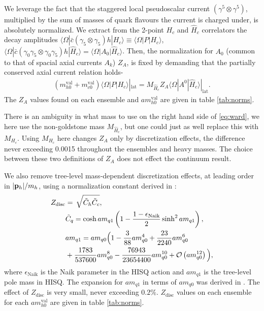 We leverage the fact that the staggered local pseudoscalar current $(\gamma^5\otimes \gamma^5)$, multiplied by the sum of masses of quark flavours the current is charged under, is absolutely normalized. We extract from the 2-point $H_c$ and $\hat{H}_c$ correlators the decay amplitudes $\langle \Omega | \bar{c} (\gamma_5\otimes \gamma_5) h | H_c \rangle \equiv \langle \Omega | P | H_c \rangle$, $\langle \Omega | \bar{c} (\gamma_0\gamma_5 \otimes \gamma_0\gamma_5) h | \hat{H}_c \rangle = \langle \Omega | A_0 | \hat{H}_c \rangle$. Then, the normalization for $A_0$ (common to that of spacial axial currents $A_k$) $Z_A$, is fixed by demanding that the partially conserved axial current relation holds-
\begin{align}
  (m^{\text{val}}_{h0} + m^{\text{val}}_{c0}) \langle \Omega | P | H_c \rangle|_{\text{lat}} = M_{\hat{H}_c} Z_A \langle \Omega | A^0 | \hat{H}_c \rangle|_{\text{lat}}.
  \label{eq:ward}
\end{align}
The $Z_A$ values found on each ensemble and $am^{\text{val}}_{h0}$ are given in table \ref{tab:norms}.

There is an ambiguity in what mass to use on the right hand side of \eqref{eq:ward}, we here use the non-goldstone mass $M_{\hat{H}_c}$, but one could just as well replace this with $M_{H_c}$. Using $M_{H_c}$ here changes $Z_A$ only by discretization effects, the difference never exceeding 0.0015 throughout the ensembles and heavy masses. The choice between these two definitions of $Z_A$ does not effect the continuum result.

We also remove tree-level mass-dependent discretization effects, at leading order in $|{\bf{p}}_h|/m_h$, using a normalization constant derived in \cite{Bazavov:2017lyh}:
\begin{align}
  \label{eq:Zdisc}
  Z_{\text{disc}} &=\,\sqrt{ \tilde{C}_h \tilde{C}_c }, \\
  \nonumber
  &\tilde{C}_q = \cosh am_{q1} \left( 1 - {1-\epsilon_{\text{Naik}}\over 2} \sinh^2 am_{q1} \right), \\ \nonumber
  &am_{q1} = am_{q0} \Big( 1 - {3\over 88}am_{q0}^4 + {23\over 2240}am_{q0}^6 \\ \nonumber
  &+ {1783\over 537600} am_{q0}^8 - {76943\over23654400}am_{q0}^{10} + \mathcal{O}\left( am_{q0}^{12} \right) \Big), \nonumber
\end{align}
where $\epsilon_{\text{Naik}}$ is the Naik parameter in the HISQ action and $am_{q1}$ is the tree-level pole mass in HISQ. The expansion for $am_{q1}$ in terms of $am_{q0}$ was derived in \cite{Follana:2006rc}. The effect of $Z_{\text{disc}}$ is very small, never exceeding $0.2\%$. $Z_{\text{disc}}$ values on each ensemble for each $am^{\text{val}}_{h0}$ are given in table \ref{tab:norms}.

